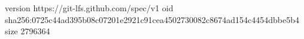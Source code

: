 version https://git-lfs.github.com/spec/v1
oid sha256:0725c44ad395b08c07201e2921c91cea4502730082c8674ad154c4454dbbe5b4
size 2796364
